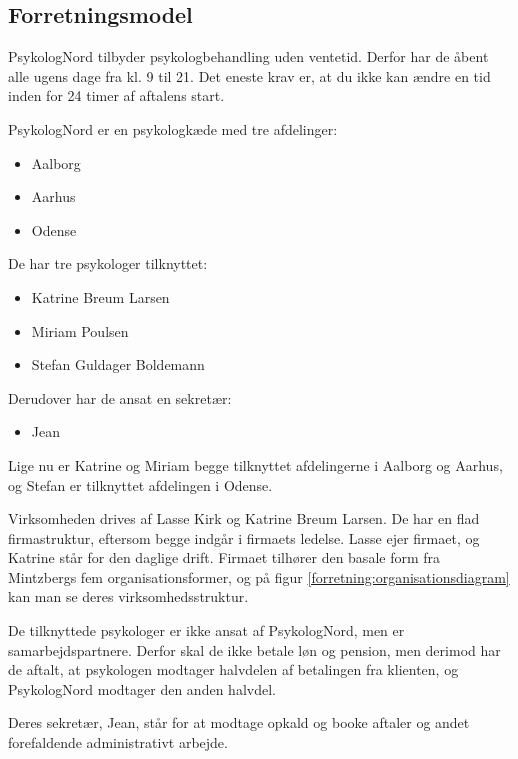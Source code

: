 \subsection{Forretningsmodel}
\label{section:forretningsmodel}

PsykologNord tilbyder psykologbehandling uden ventetid.
Derfor har de åbent alle ugens dage fra kl. 9 til 21. Det eneste krav er, at du ikke kan ændre en tid inden for 24 timer af aftalens start.

PsykologNord er en psykologkæde med tre afdelinger:
\begin{itemize}
    \item Aalborg
    \item Aarhus
    \item Odense
\end{itemize}

De har tre psykologer tilknyttet:

\begin{itemize}
    \item Katrine Breum Larsen
    \item Miriam Poulsen
    \item Stefan Guldager Boldemann
\end{itemize}

Derudover har de ansat en sekretær:

\begin{itemize}
	\item Jean
\end{itemize}

Lige nu er Katrine og Miriam begge tilknyttet afdelingerne i Aalborg og Aarhus, og Stefan er tilknyttet afdelingen i Odense.


Virksomheden drives af Lasse Kirk og Katrine Breum Larsen.
De har en flad firmastruktur, eftersom begge indgår i firmaets ledelse. Lasse ejer firmaet, og Katrine står for den daglige drift. 
Firmaet tilhører den basale form fra Mintzbergs fem organisationsformer, og på 
figur \ref{forretning:organisationsdiagram} kan man se deres virksomhedsstruktur.

De tilknyttede psykologer er ikke ansat af PsykologNord, men er samarbejdspartnere.
Derfor skal de ikke betale løn og pension, men derimod har de aftalt, at psykologen modtager halvdelen af betalingen fra klienten, og PsykologNord modtager den anden halvdel.

Deres sekretær, Jean, står for at modtage opkald og booke aftaler og andet forefaldende administrativt arbejde.

